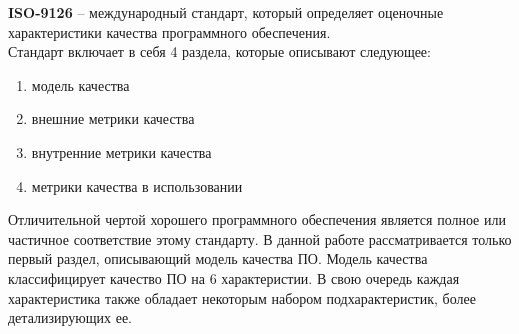 \documentclass[a4paper,14pt]{extreport} %
\begin{document}
\textbf{ISO-9126} -- международный стандарт, который определяет оценочные характеристики качества программного обеспечения\cite{ISO_9126}. \\
Стандарт включает в себя 4 раздела, которые описывают следующее:
\begin{enumerate}
\item модель качества
\item внешние метрики качества
\item внутренние метрики качества
\item метрики качества в использовании
\end{enumerate} 
Отличительной чертой хорошего программного обеспечения является полное или частичное соответствие этому стандарту.
В данной работе рассматривается только первый раздел, описывающий модель качества ПО. Модель качества классифицирует качество ПО на 6 характеристии. В свою очередь каждая характеристика также обладает некоторым набором подхарактеристик, более детализирующих ее.
\end{document}
